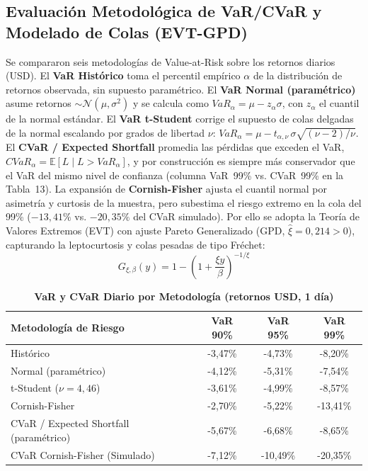 \documentclass[10pt,a4paper]{article}
\begin{document}
\subsection{Evaluación Metodológica de VaR/CVaR y Modelado de Colas (EVT-GPD)}
Se compararon seis metodologías de Value-at-Risk sobre los retornos diarios (USD). El \textbf{VaR Histórico} toma el percentil empírico $\alpha$ de la distribución de retornos observada, sin supuesto paramétrico. El \textbf{VaR Normal (paramétrico)} asume retornos $\sim \mathcal{N}(\mu,\sigma^2)$ y se calcula como $VaR_\alpha = \mu - z_\alpha \sigma$, con $z_\alpha$ el cuantil de la normal estándar. El \textbf{VaR t-Student} corrige el supuesto de colas delgadas de la normal escalando por grados de libertad $\nu$: $VaR_\alpha = \mu - t_{\alpha,\nu}\,\sigma\sqrt{(\nu-2)/\nu}$. El \textbf{CVaR / Expected Shortfall} promedia las pérdidas que exceden el VaR, $CVaR_\alpha = \mathbb{E}[L \mid L > VaR_\alpha]$, y por construcción es siempre más conservador que el VaR del mismo nivel de confianza (columna VaR~99\% vs. CVaR~99\% en la Tabla~13). La expansión de \textbf{Cornish-Fisher} ajusta el cuantil normal por asimetría y curtosis de la muestra, pero subestima el riesgo extremo en la cola del 99\% ($-13,41\%$ vs. $-20,35\%$ del CVaR simulado). Por ello se adopta la Teoría de Valores Extremos (EVT) con ajuste Pareto Generalizado (GPD, $\hat{\xi} = 0,214 > 0$), capturando la leptocurtosis y colas pesadas de tipo Fréchet:
\begin{equation}
    G_{\xi, \beta}(y) = 1 - \left(1 + \frac{\xi y}{\beta}\right)^{-1/\xi}
\end{equation}

\begin{table}[H]
\centering
\caption{\textbf{VaR y CVaR Diario por Metodología (retornos USD, 1 día)}}
\small
\begin{tabularx}{\textwidth}{Xccc}
\toprule
\textbf{Metodología de Riesgo} & \textbf{VaR 90\%} & \textbf{VaR 95\%} & \textbf{VaR 99\%} \\
\midrule
Histórico & -3,47\% & -4,73\% & -8,20\% \\
Normal (paramétrico) & -4,12\% & -5,31\% & -7,54\% \\
t-Student ($\nu=4,46$) & -3,61\% & -4,99\% & -8,57\% \\
Cornish-Fisher & -2,70\% & -5,22\% & -13,41\% \\
CVaR / Expected Shortfall (paramétrico) & -5,67\% & -6,68\% & -8,65\% \\
CVaR Cornish-Fisher (Simulado) & -7,12\% & -10,49\% & -20,35\% \\
\bottomrule
\end{tabularx}
\end{table}
\end{document}
